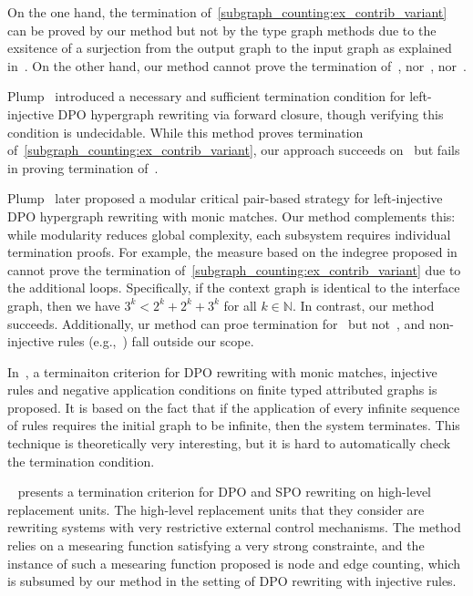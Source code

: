 On the one hand, the termination of~\autoref{subgraph_counting:ex_contrib_variant} can be proved by our method but not by the type graph methods due to the exsitence of a surjection from the output graph to the input graph as explained in~\cite[Example D.4]{endrullis2024generalized_arxiv_v2}. On the other hand, our method cannot prove the termination of~\cite[Example 1, 5 and Ad-hoc Routing Protocol]{bruggink2014termination}, nor~\cite[Example 5, 6]{bruggink2015proving}, nor~\cite[Examples D2 and D3]{endrullis2024generalized_arxiv_v2}.

Plump~\cite{plump1995ontermination} introduced a necessary and sufficient termination condition for left-injective DPO hypergraph rewriting via forward closure, though verifying this condition is undecidable. 
While this method proves termination of~\autoref{subgraph_counting:ex_contrib_variant}, our approach succeeds on~\cite[Example 3.8]{plump1995ontermination} but fails in proving termination of~\cite[Example 4.1]{plump1995ontermination}. 

Plump~\cite{plump2018modular} later proposed a modular critical pair-based strategy for left-injective DPO hypergraph rewriting with monic matches. 
Our method complements this: while modularity reduces global complexity, each subsystem requires individual termination proofs. For example, the measure based on the indegree proposed in~\cite{plump2018modular} cannot prove the termination of~\autoref{subgraph_counting:ex_contrib_variant} due to the additional loops. Specifically, if the context graph is identical to the interface graph, then we have $3^k < 2^k+2^k+3^k$ for all $k \in \mathbb{N}$. In contrast, our method succeeds.
Additionally, ur method can proe termination for~\cite[Examples 1 and 5]{plump2018modular} but not~\cite[Example 4]{plump2018modular}, and non-injective rules (e.g.,~\cite[Example 6]{plump2018modular}) fall outside our scope.

In~\cite{LEVENDOVSZKY200787}, a terminaiton criterion for DPO rewriting with monic matches, injective rules and negative application conditions on finite typed attributed graphs is proposed. It is based on the fact that if the application of every infinite sequence of rules requires the initial graph to be infinite, then the system terminates. This technique is theoretically very interesting, but it is hard to automatically check the termination condition.

~\cite{bottoni2005termination} presents a termination criterion for DPO and SPO rewriting on high-level replacement units. The high-level replacement units that they consider are rewriting systems with very restrictive external control mechanisms. The method relies on a mesearing function satisfying a very strong constrainte, and the instance of such a mesearing function proposed is node and edge counting, which is subsumed by our method in the setting of DPO rewriting with injective rules.

